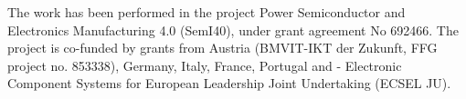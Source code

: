 The work has been performed in the project Power Semiconductor and Electronics Manufacturing 4.0 (SemI40), under grant agreement No 692466. The project is co-funded by grants from Austria (BMVIT-IKT der Zukunft, FFG project no. 853338), Germany, Italy, France, Portugal and - Electronic Component Systems for European Leadership Joint Undertaking (ECSEL JU).
